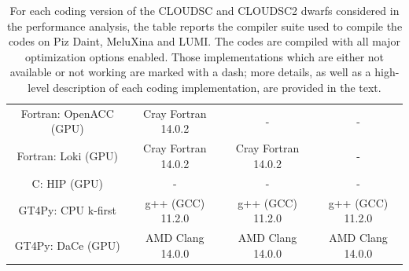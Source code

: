 \documentclass[main.tex]{subfiles}
\begin{document}
\begin{table}[t!]
\begin{footnotesize}
\begin{tabular}{|c|c|c|c|}
                 Fortran: OpenACC (GPU) & Cray Fortran 14.0.2 & - & - \\
                 Fortran: Loki (GPU) & Cray Fortran 14.0.2 & Cray Fortran 14.0.2 & - \\
                 C: HIP (GPU) & - & - & - \\
                 GT4Py: CPU k-first & g++ (GCC) 11.2.0 & g++ (GCC) 11.2.0 & g++ (GCC) 11.2.0 \\
                 GT4Py: DaCe (GPU) & AMD Clang 14.0.0 & AMD Clang 14.0.0 & AMD Clang 14.0.0 \\
                 \hline
            \end{tabular}
        \end{footnotesize}
        \vspace*{0.2cm}
        \caption{For each coding version of the CLOUDSC and CLOUDSC2 dwarfs considered in the performance analysis, the table reports the compiler suite used to compile the codes on Piz Daint, MeluXina and LUMI. The codes are compiled with all major optimization options enabled. Those implementations which are either not available or not working are marked with a dash; more details, as well as a high-level description of each coding implementation, are provided in the text.}
        \label{tab:compiler}
    \end{table}
\end{document}
